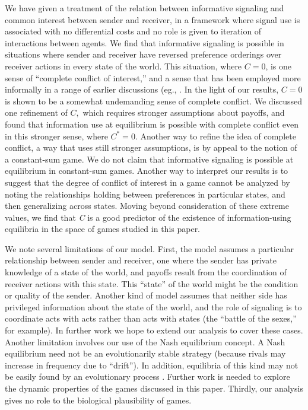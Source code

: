 \documentclass[10pt]{article}
\begin{document}
We have given a treatment of the relation between informative signaling
and common interest between sender and receiver, in a framework where
signal use is associated with no differential costs and no role is given
to iteration of interactions between agents. We find that informative
signaling is possible in situations where sender and receiver have
reversed preference orderings over receiver actions in every state of
the world. This situation, where $C=0$, is one sense of ``complete
conflict of interest,'' and a sense that has been employed more
informally in a range of earlier discussions (eg., \cite{Maynard-Smith1994,Searcy2005}. In the light of our results, $C=0$ is shown to
be a somewhat undemanding sense of complete conflict. We discussed one
refinement of $C,$ which requires stronger assumptions about payoffs, and
found that information use at equilibrium is possible with complete
conflict even in this stronger sense, where $C^*=0$. Another way to
refine the idea of complete conflict, a way that uses still stronger
assumptions, is by appeal to the notion of a constant-sum game. We do
not claim that informative signaling is possible at equilibrium in
constant-sum games. Another way to interpret our results is to suggest
that the degree of conflict of interest in a game cannot be analyzed by
noting the relationships holding between preferences in particular
states, and then generalizing across states. Moving beyond consideration
of these extreme values, we find that \emph{C} is a good predictor of
the existence of information-using equilibria in the space of games
studied in this paper.

We note several limitations of our model. First, the model assumes a
particular relationship between sender and receiver, one where the
sender has private knowledge of a state of the world, and payoffs
result from the coordination of receiver actions with this state. This
``state'' of the world might be the condition or quality of the sender.
Another kind of model assumes that neither side has privileged
information about the state of the world, and the role of signaling is
to coordinate acts with acts rather than acts with states (the ``battle
of the sexes,'' for example). In further work we hope to extend our
analysis to cover these cases. Another limitation involves our use of
the Nash equilibrium concept. A Nash equilibrium need not be an
evolutionarily stable strategy (because rivals may increase in frequency
due to ``drift''). In addition, equilibria of this kind may not be
easily found by an evolutionary process \cite{Huttegger2010}. Further
work is needed to explore the dynamic properties of the games discussed
in this paper. Thirdly, our analysis gives no role to the biological
plausibility of games.
\end{document}
